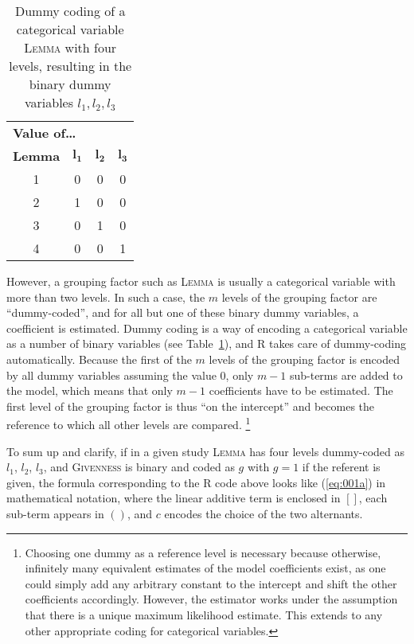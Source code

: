 \begin{table}
  \centering
  \begin{tabular}{cccc}
    \toprule
    \multicolumn{4}{l}{\textbf{Value of\ldots}} \\
    \textbf{Lemma} & $\mathbf{l_1}$ & $\mathbf{l_2}$ & $\mathbf{l_3}$ \\
    \midrule
    1 & 0 & 0 & 0 \\ 
    2 & 1 & 0 & 0 \\ 
    3 & 0 & 1 & 0 \\ 
    4 & 0 & 0 & 1 \\ 
    \bottomrule
  \end{tabular}
  \caption{Dummy coding of a categorical variable \textsc{Lemma} with four levels, resulting in the binary dummy variables $l_1,l_2,l_3$}
  \label{tab:dummy}
\end{table}

However, a grouping factor such as \textsc{Lemma} is usually a categorical variable with more than two levels.
In such a case, the $m$ levels of the grouping factor are ``dummy-coded'', and for all but one of these binary dummy variables, a coefficient is estimated.
Dummy coding is a way of encoding a categorical variable as a number of binary variables (see Table~\ref{tab:dummy}), and R takes care of dummy-coding automatically.
Because the first of the $m$ levels of the grouping factor is encoded by all dummy variables assuming the value 0, only $m-1$ sub-terms are added to the model, which means that only $m-1$ coefficients have to be estimated.
The first level of the grouping factor is thus ``on the intercept'' and becomes the reference to which all other levels are compared.%
\footnote{Choosing one dummy as a reference level is necessary because otherwise, infinitely many equivalent estimates of the model coefficients exist, as one could simply add any arbitrary constant to the intercept and shift the other coefficients accordingly.
However, the estimator works under the assumption that there is a unique maximum likelihood estimate.
This extends to any other appropriate coding for categorical variables.
}

To sum up and clarify, if in a given study \textsc{Lemma} has four levels dummy-coded as $l_1$, $l_2$, $l_3$, and \textsc{Givenness} is binary and coded as $g$ with $g=1$ if the referent is given, the formula corresponding to the R code above looks like (\ref{eq:001a}) in mathematical notation, where the linear additive term is enclosed in $[ ]$, each sub-term appears in $( )$, and $c$ encodes the choice of the two alternants.

